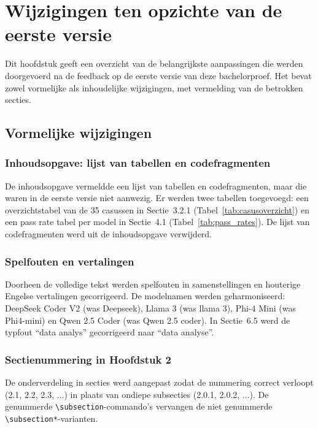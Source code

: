 
\chapter{Wijzigingen ten opzichte van de eerste versie}%
\label{ch:wijzigingen}

Dit hoofdstuk geeft een overzicht van de belangrijkste aanpassingen die werden doorgevoerd na de feedback op de eerste versie van deze bachelorproef. Het bevat zowel vormelijke als inhoudelijke wijzigingen, met vermelding van de betrokken secties.

\section{Vormelijke wijzigingen}

\subsection{Inhoudsopgave: lijst van tabellen en codefragmenten}
De inhoudsopgave vermeldde een lijst van tabellen en codefragmenten, maar die waren in de eerste versie niet aanwezig. Er werden twee tabellen toegevoegd: een overzichtstabel van de 35 casussen in Sectie~3.2.1 (Tabel~\ref{tab:casusoverzicht}) en een pass rate tabel per model in Sectie~4.1 (Tabel~\ref{tab:pass_rates}). De lijst van codefragmenten werd uit de inhoudsopgave verwijderd.

\subsection{Spelfouten en vertalingen}
Doorheen de volledige tekst werden spelfouten in samenstellingen en houterige Engelse vertalingen gecorrigeerd. De modelnamen werden geharmoniseerd: DeepSeek Coder V2 (was Deepseek), Llama 3 (was llama 3), Phi-4 Mini (was Phi4-mini) en Qwen 2.5 Coder (was Qwen 2.5 coder). In Sectie~6.5 werd de typfout ``data analys'' gecorrigeerd naar ``data analyse''.

\subsection{Sectienummering in Hoofdstuk 2}
De onderverdeling in secties werd aangepast zodat de nummering correct verloopt (2.1, 2.2, 2.3, ...) in plaats van ondiepe subsecties (2.0.1, 2.0.2, ...). De genummerde \verb|\subsection|-commando's vervangen de niet genummerde \verb|\subsection*|-varianten.

